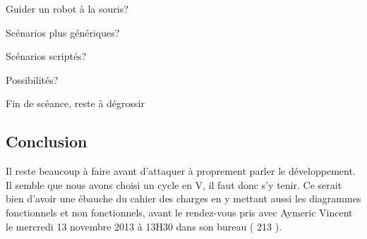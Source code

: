 \documentclass[a4paper,10pt]{article}
\begin{document}
Guider un robot à la souris?

Scénarios plus génériques?

Scénarios scriptés?

Possibilités?

Fin de scéance, reste à dégrossir

\subsection*{Conclusion}
 Il reste beaucoup à faire avant d'attaquer à proprement parler le développement. Il semble que nous avons choisi un cycle en V, il faut donc s'y tenir. Ce serait bien d'avoir une ébauche du cahier des charges en y mettant aussi les diagrammes fonctionnels et non fonctionnels, avant le rendez-vous pris avec Aymeric Vincent le mercredi 13 novembre 2013 à 13H30 dans son bureau ( 213 ).    
\end{document}
